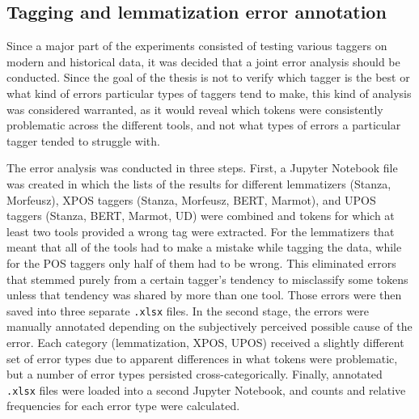 \subsection{Tagging and lemmatization error annotation}
\label{subsec:error-annotation}

Since a major part of the experiments consisted of testing various taggers on modern and historical data, it was decided that a joint error analysis should be conducted. Since the goal of the thesis is not to verify which tagger is the best or what kind of errors particular types of taggers tend to make, this kind of analysis was considered warranted, as it would reveal which tokens were consistently problematic across the different tools, and not what types of errors a particular tagger tended to struggle with.

The error analysis was conducted in three steps. First, a Jupyter Notebook file was created in which the lists of the results for different lemmatizers (Stanza, Morfeusz), XPOS taggers (Stanza, Morfeusz, BERT, Marmot), and UPOS taggers (Stanza, BERT, Marmot, UD) were combined and tokens for which at least two tools provided a wrong tag were extracted. For the lemmatizers that meant that all of the tools had to make a mistake while tagging the data, while for the POS taggers only half of them had to be wrong. This eliminated errors that stemmed purely from a certain tagger's tendency to misclassify some tokens unless that tendency was shared by more than one tool. Those errors were then saved into three separate \texttt{.xlsx} files. In the second stage, the errors were manually annotated depending on the subjectively perceived possible cause of the error. Each category (lemmatization, XPOS, UPOS) received a slightly different set of error types due to apparent differences in what tokens were problematic, but a number of error types persisted cross-categorically. Finally, annotated \texttt{.xlsx} files were loaded into a second Jupyter Notebook, and counts and relative frequencies for each error type were calculated. 
